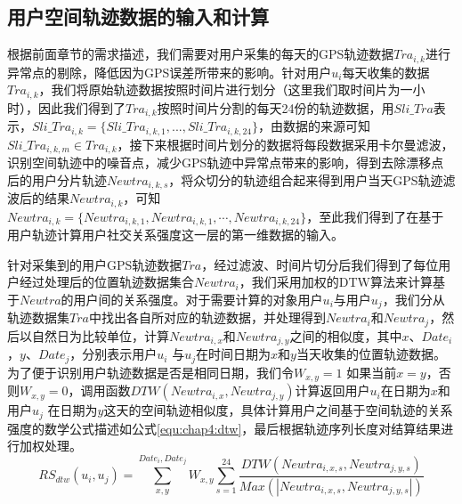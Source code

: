 \subsection{用户空间轨迹数据的输入和计算}
根据前面章节的需求描述，我们需要对用户采集的每天的GPS轨迹数据$Tra_{i,k}$进行异常点的剔除，降低因为GPS误差所带来的影响。针对用户$u_{i}$每天收集的数据$Tra_{i,k}$，我们将原始轨迹数据按照时间片进行划分（这里我们取时间片为一小时），因此我们得到了$Tra_{i,k}$按照时间片分割的每天24份的轨迹数据，用$Sli\_Tra$表示，$Sli\_Tra_{i,k}=\{Sli\_Tra_{i,k,1},...,Sli\_Tra_{i,k,24}\}$，由数据的来源可知$Sli\_Tra_{i,k,m} \in Tra_{i,k}$，接下来根据时间片划分的数据将每段数据采用卡尔曼滤波，识别空间轨迹中的噪音点，减少GPS轨迹中异常点带来的影响，得到去除漂移点后的用户分片轨迹$Newtra_{i,k,s}$，将众切分的轨迹组合起来得到用户当天GPS轨迹滤波后的结果$Newtra_{i,k}$，可知$Newtra_{i,k}=\{ Newtra_{i,k,1},Newtra_{i,k,1}, \cdots,Newtra_{i,k,24}\}$，至此我们得到了在基于用户轨迹计算用户社交关系强度这一层的第一维数据的输入。
\par 针对采集到的用户GPS轨迹数据$Tra$，经过滤波、时间片切分后我们得到了每位用户经过处理后的位置轨迹数据集合$Newtra_{i}$，我们采用加权的DTW算法来计算基于$Newtra$的用户间的关系强度。对于需要计算的对象用户$u_{i}$与用户$u_{j}$，我们分从轨迹数据集$Tra$中找出各自所对应的轨迹数据，并处理得到$Newtra_{i}$和$Newtra_{j}$，然后以自然日为比较单位，计算$Newtra_{i,x}$和$Newtra_{j,y}$之间的相似度，其中$x 、 Date_{i}$，$y 、 Date_{j}$，分别表示用户$u_{i}$ 与$u_{j}$在时间日期为$x$和$y$当天收集的位置轨迹数据。为了便于识别用户轨迹数据是否是相同日期，我们令$W_{x,y}=1$ 如果当前$x=y$，否则$W_{x,y}=0$，调用函数$DTW(Newtra_{i,x},Newtra_{j,y})$计算返回用户$u_{i}$在日期为$x$和用户$u_{j}$ 在日期为$y$这天的空间轨迹相似度，具体计算用户之间基于空间轨迹的关系强度的数学公式描述如公式\ref{equ:chap4:dtw}，最后根据轨迹序列长度对结算结果进行加权处理。
\begin{equation}
\label{equ:chap4:dtw}
RS_{dtw}(u_{i},u_{j})=\sum_{x ,y }^{ Date_{i}, Date_{j}}W_{x,y}\sum_{s=1}^{24} \frac{DTW(Newtra_{i,x,s},Newtra_{j,y,s})}{Max(\left | Newtra_{i,x,s},Newtra_{j,y,s}  \right |)}
\end{equation}
